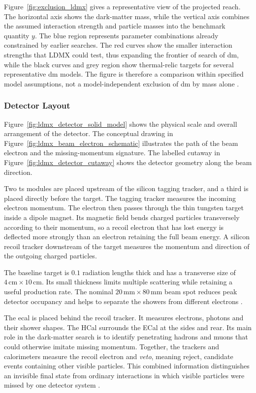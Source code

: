 Figure~\ref{fig:exclusion_ldmx} gives a representative view of the projected
reach. The horizontal axis shows the dark-matter mass, while the vertical
axis combines the assumed interaction strength and particle masses into the
benchmark quantity \(y\). The blue region represents parameter combinations
already constrained by earlier searches. The red curves show the smaller
interaction strengths that LDMX could test, thus expanding the frontier of 
search of \gls{dm}, while the black curves and grey
region show thermal-relic targets for several representative \gls{dm}
models. The figure is therefore a comparison within specified model
assumptions, not a model-independent exclusion of \gls{dm} by mass alone
\cite{akesson2022-ldmx-status,catena2023-spin1-thermal-targets,
ldmx2025-overview}.

\subsubsection{Detector Layout}

Figure~\ref{fig:ldmx_detector_solid_model} shows the physical scale and
overall arrangement of the detector. The conceptual drawing in
Figure~\ref{fig:ldmx_beam_electron_schematic} illustrates the path of the
beam electron and the missing-momentum signature. The labelled cutaway in
Figure~\ref{fig:ldmx_detector_cutaway} shows the detector geometry along the
beam direction.

Two \gls{ts} modules are placed upstream of the silicon tagging tracker, and
a third is placed directly before the target. The tagging tracker measures
the incoming electron momentum. The electron then passes through the thin
tungsten target inside a dipole magnet. Its magnetic field bends charged
particles transversely according to their momentum, so a recoil electron
that has lost energy is deflected more strongly than an electron retaining
the full beam energy. A silicon recoil tracker downstream of the target
measures the momentum and direction of the outgoing charged particles.

The baseline target is \(0.1\) radiation lengths thick and has a transverse
size of \(4\,\mathrm{cm}\times10\,\mathrm{cm}\). Its small thickness limits
multiple scattering while retaining a useful production rate. The nominal
\(20\,\mathrm{mm}\times80\,\mathrm{mm}\) beam spot reduces peak detector
occupancy and helps to separate the showers from different electrons
\cite{ldmx2025-overview}.

The \gls{ecal} is placed behind the recoil tracker. It measures electrons,
photons and their shower shapes. The HCal surrounds the ECal at the sides
and rear. Its main role in the dark-matter search is to identify penetrating
hadrons and muons that could otherwise imitate missing momentum. Together,
the trackers and calorimeters measure the recoil electron and \emph{veto},
meaning reject, candidate events containing other visible particles. This
combined information distinguishes an invisible final state from ordinary
interactions in which visible particles were missed by one detector system
\cite{ldmx2025-overview}.

